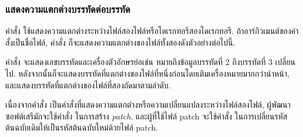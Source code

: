 \begin{thwbr}
\subsubsection{แสดงความแตกต่างบรรทัดต่อบรรทัด}
คำสั่ง  ใช้แสดงความแตกต่างระหว่างไฟล์สองไฟล์หรือไดเรกทอรีสองไดเรกทอรี. ถ้าอาร์กิวเมนต์ของคำสั่งเป็นชื่อไฟล์, คำสั่ง  ก็จะแสดงความแตกต่างของไฟล์ทั้งสองดังตัวอย่างต่อไปนี้.
\begin{MyExample}
\end{MyExample}%
คำสั่ง  จะแสดงเลขบรรทัดและเครื่องตัวอักษรย่อเช่น  หมายถึงข้อมูลบรรทัดที่ 2 ถึงบรรทัดที่ 3 เปลี่ยนไป. หลังจากนั้นก็จะแสดงบรรทัดที่แตกต่างของไฟล์ที่หนึ่งก่อนโดยเติมเครื่องหมายมากกว่านำหน้า, และแสดงบรรทัดที่แตกต่างของไฟล์ที่สองถัดมาตามลำดับ.

เนื่องจากคำสั่ง  เป็นคำสั่งที่แสดงความแตกต่างหรือความเปลี่ยนแปลงระหว่างไฟล์สองไฟล์, ผู้พัฒนาซอฟต์เสรีมักจะใช้คำสั่ง  ในการสร้าง \emph{patch}. และผู้ที่ใช้ไฟล์ patch จะใช้คำสั่ง  ในการเปลี่ยนรหัสต้นฉบับเดิมให้เป็นรหัสต้นฉบับใหม่ด้วยไฟล์ patch.


\end{thwbr}
